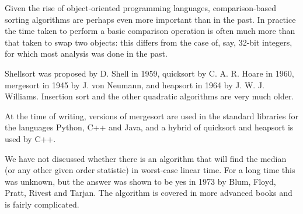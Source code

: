 Given the rise of object-oriented programming languages,  comparison-based 
sorting algorithms are perhaps even more important than in the past. In practice
the time taken to perform a basic comparison operation is often much more than that 
taken to swap two objects: this differs from the case of, say, 32-bit integers,
for which most analysis was done in the past. 

Shellsort was proposed by D. Shell in 1959, quicksort by C. A. R. Hoare in 1960,
mergesort in 1945 by J. von Neumann, and heapsort in 1964 by J. W. J. Williams. 
Insertion sort and the other quadratic algorithms are very much older.

At the time of writing, versions of mergesort are used in the standard libraries for
the languages Python, C++ and Java, and a hybrid of quicksort and heapsort is used
by C++.

We have not discussed whether there is an algorithm that will find the 
median (or any other given order statistic) in worst-case linear time.
For a long time this was unknown, but the answer was shown to be yes in 1973 by 
Blum, Floyd, Pratt, Rivest and Tarjan. The algorithm is covered in more 
advanced books and is fairly complicated. 



